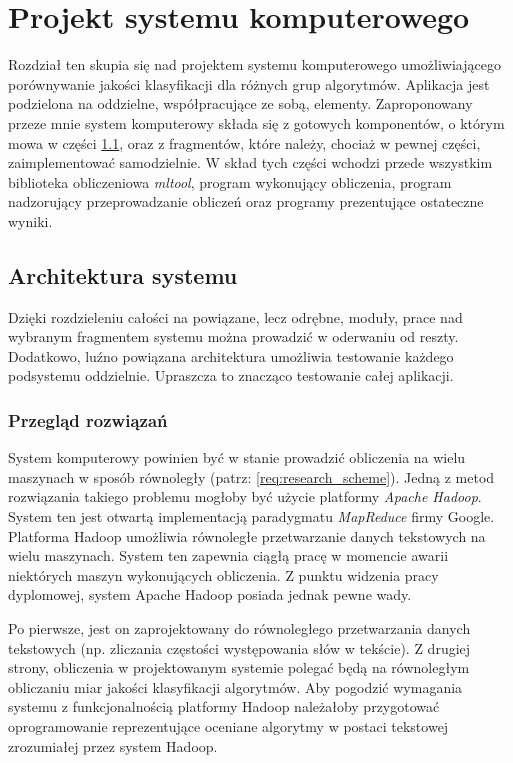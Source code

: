\documentclass[../thesis.tex]{subfiles}
\begin{document}
\pagestyle{plain}

\chapter{Projekt systemu komputerowego}

Rozdział ten skupia się nad projektem systemu komputerowego umożliwiającego porównywanie jakości klasyfikacji dla różnych grup algorytmów. Aplikacja jest podzielona na oddzielne, współpracujące ze sobą, elementy. Zaproponowany przeze mnie system komputerowy składa się z gotowych komponentów, o którym mowa w części \ref{proj:arch}, oraz z fragmentów, które należy, chociaż w pewnej części, zaimplementować samodzielnie. W skład tych części wchodzi przede wszystkim biblioteka obliczeniowa \emph{mltool}, program wykonujący obliczenia, program nadzorujący przeprowadzanie obliczeń oraz programy prezentujące ostateczne wyniki.

\section{Architektura systemu}
\label{proj:arch}

Dzięki rozdzieleniu całości na powiązane, lecz odrębne, moduły, prace nad wybranym fragmentem systemu można prowadzić w oderwaniu od reszty. Dodatkowo, luźno powiązana architektura umożliwia testowanie każdego podsystemu oddzielnie. Upraszcza to znacząco testowanie całej aplikacji.

\subsection{Przegląd rozwiązań}

System komputerowy powinien być w stanie prowadzić obliczenia na wielu maszynach w sposób równoległy (patrz: \ref{req:research_scheme}). Jedną z metod rozwiązania takiego problemu mogłoby być użycie platformy \emph{Apache Hadoop}. System ten jest otwartą implementacją paradygmatu \emph{MapReduce} firmy Google. Platforma Hadoop umożliwia równoległe przetwarzanie danych tekstowych na wielu maszynach. System ten zapewnia ciągłą pracę w momencie awarii niektórych maszyn wykonujących obliczenia. Z punktu widzenia pracy dyplomowej, system Apache Hadoop posiada jednak pewne wady. 

Po pierwsze, jest on zaprojektowany do równoległego przetwarzania danych tekstowych (np. zliczania częstości występowania słów w tekście). Z drugiej strony, obliczenia w projektowanym systemie polegać będą na równoległym obliczaniu miar jakości klasyfikacji algorytmów. Aby pogodzić wymagania systemu z funkcjonalnością platformy Hadoop należałoby przygotować oprogramowanie reprezentujące oceniane algorytmy w postaci tekstowej zrozumiałej przez system Hadoop. 
\end{document}
